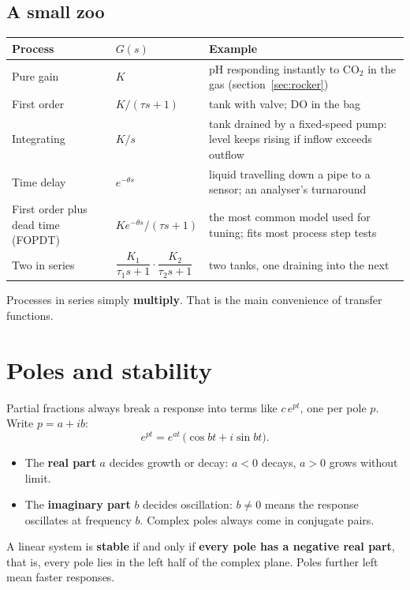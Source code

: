 \documentclass[11pt,a4paper]{article}
\begin{document}
\subsection{A small zoo}
\begin{center}\small
\begin{tabularx}{\textwidth}{@{}l l X@{}}
\toprule
Process & $G(s)$ & Example \\
\midrule
Pure gain & $K$ & pH responding instantly to CO$_2$ in the gas (section~\ref{sec:rocker}) \\
First order & $K/(\tau s+1)$ & tank with valve; DO in the bag \\
Integrating & $K/s$ & tank drained by a fixed-speed pump: level keeps rising if inflow exceeds outflow \\
Time delay & $e^{-\theta s}$ & liquid travelling down a pipe to a sensor; an analyser's turnaround \\
First order plus dead time (FOPDT) & $K e^{-\theta s}/(\tau s+1)$ & the most common model used for tuning; fits most process step tests \\
Two in series & $\dfrac{K_1}{\tau_1 s+1}\cdot\dfrac{K_2}{\tau_2 s+1}$ & two tanks, one draining into the next \\
\bottomrule
\end{tabularx}
\end{center}
Processes in series simply \textbf{multiply}. That is the main convenience of transfer functions.

\section{Poles and stability}
\label{sec:poles}
Partial fractions always break a response into terms like $c\,e^{pt}$, one per pole $p$. Write
$p = a + ib$:
\[
  e^{pt} = e^{at}\,\bigl(\cos bt + i \sin bt\bigr).
\]
\begin{itemize}
  \item The \textbf{real part} $a$ decides growth or decay: $a < 0$ decays, $a > 0$ grows without limit.
  \item The \textbf{imaginary part} $b$ decides oscillation: $b \ne 0$ means the response oscillates at
    frequency $b$. Complex poles always come in conjugate pairs.
\end{itemize}
\begin{idea}
A linear system is \textbf{stable} if and only if \textbf{every pole has a negative real part}, that is,
every pole lies in the left half of the complex plane. Poles further left mean faster responses.
\end{idea}
\end{document}
